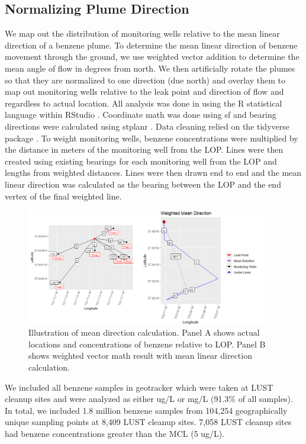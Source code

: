 \documentclass[draft,linenumbers]{agujournal2018}
\begin{document}
\subsection{Normalizing Plume Direction}

We map out the distribution of monitoring wells relative to the mean
linear direction of a benzene plume. To determine the mean linear
direction of benzene movement through the ground, we use weighted vector
addition to determine the mean angle of flow in degrees from north. We
then artificially rotate the plumes so that they are normalized to one
direction (due north) and overlay them to map out monitoring wells
relative to the leak point and direction of flow and regardless to
actual location. All analysis was done in using the R statistical
language \citep{R} within RStudio \citep{RStudio}. Coordinate math was
done using sf \citep{sf} and bearing directions were calculated using
stplanr \citep{stplanr}. Data cleaning relied on the tidyverse package
\citep{tidyverse}. To weight monitoring wells, benzene concentrations
were multiplied by the distance in meters of the monitoring well from
the LOP. Lines were then created using existing bearings for each
monitoring well from the LOP and lengths from weighted distances. Lines
were then drawn end to end and the mean linear direction was calculated
as the bearing between the LOP and the end vertex of the final weighted
line.

\begin{figure}[h]
\includegraphics[width=400px,]{img/meanDirection} \caption{Illustration of mean direction calculation. Panel A shows actual locations and concentrations of benzene relative to LOP. Panel B shows weighted vector math result with mean linear direction calculation.}\label{fig:fig1}
\end{figure}

We included all benzene samples in geotracker which were taken at LUST
cleanup sites and were analyzed as either ug/L or mg/L (91.3\% of all
samples). In total, we included 1.8 million benzene samples from 104,254
geographically unique sampling points at 8,409 LUST cleanup sites. 7,058
LUST cleanup sites had benzene concentrations greater than the MCL (5
ug/L).
\end{document}
